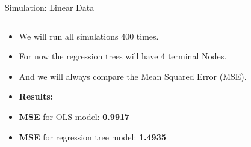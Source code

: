 \documentclass[10pt]{beamer}
\begin{document}
\begin{frame}{Simulation: Linear Data}
\begin{columns}[T]
\begin{column}{0.5\textwidth}
\begin{itemize}
            \item We will run all simulations 400 times.
                 \item For now the regression trees will have 4 terminal Nodes.
                \item And we will always compare the Mean Squared Error (MSE).
                \vspace{1cm}
                \item \textbf{Results:}
                \item \textbf{MSE} for OLS model: \textbf{0.9917} 
                \item \textbf{MSE} for regression tree model: \textbf{1.4935} 
            \end{itemize}
        \end{column}
    \end{columns}
\end{frame}
\end{document}
